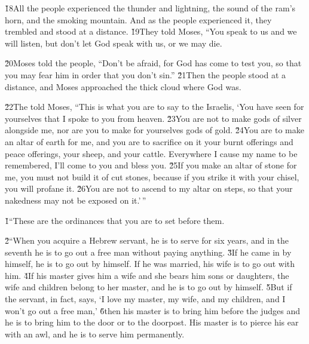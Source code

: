 \v{18}All the people experienced the thunder and lightning, the sound of the ram's horn, and the smoking mountain. And as the people experienced it, they trembled and stood at a distance. \v{19}They told Moses, ``You speak to us and we will listen, but don't let God speak with us, or we may die.

\v{20}Moses told the people, ``Don't be afraid, for God has come to test you, so that you may fear him in order that you don't sin.'' \v{21}Then the people stood at a distance, and Moses approached the thick cloud where God was.

\v{22}The  told Moses, ``This is what you are to say to the Israelis, `You have seen for yourselves that I spoke to you from heaven. \v{23}You are not to make gods of silver alongside me, nor are you to make for yourselves gods of gold. \v{24}You are to make an altar of earth for me, and you are to sacrifice on it your burnt offerings and peace offerings, your sheep, and your cattle. Everywhere I cause my name to be remembered, I'll come to you and bless you. \v{25}If you make an altar of stone for me, you must not build it of cut stones, because if you strike it with your chisel, you will profane it. \v{26}You are not to ascend to my altar on steps, so that your nakedness may not be exposed on it.'\,''

\v{1}``These are the ordinances that you are to set before them.

\v{2}``When you acquire a Hebrew servant, he is to serve for six years, and in the seventh he is to go out a free man without paying anything. \v{3}If he came in by himself, he is to go out by himself. If he was married, his wife is to go out with him. \v{4}If his master gives him a wife and she bears him sons or daughters, the wife and children belong to her master, and he is to go out by himself. \v{5}But if the servant, in fact, says, `I love my master, my wife, and my children, and I won't go out a free man,' \v{6}then his master is to bring him before the judges and he is to bring him to the door or to the doorpost. His master is to pierce his ear with an awl, and he is to serve him permanently.

